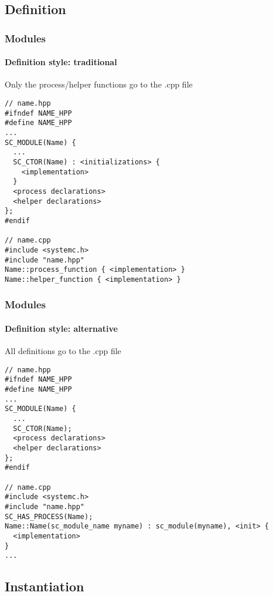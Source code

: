\subsection{Definition}

\begin{frame}[fragile]
\frametitle{Modules}
\framesubtitle{Definition style: traditional}

\begin{block}{Only the process/helper functions go to the .cpp file}
{\scriptsize
\vspace{-0.5em}
\begin{verbatim}
// name.hpp
#ifndef NAME_HPP
#define NAME_HPP
...
SC_MODULE(Name) {
  ...
  SC_CTOR(Name) : <initializations> {
    <implementation>
  }
  <process declarations>
  <helper declarations>
};
#endif

// name.cpp
#include <systemc.h>
#include "name.hpp"
Name::process_function { <implementation> }
Name::helper_function { <implementation> }
\end{verbatim}
}
\vspace{-0.5em}
\end{block}
\end{frame}

\begin{frame}[fragile]
\frametitle{Modules}
\framesubtitle{Definition style: alternative}

\begin{block}{All definitions go to the .cpp file}
{\scriptsize
\vspace{-0.5em}
\begin{verbatim}
// name.hpp
#ifndef NAME_HPP
#define NAME_HPP
...
SC_MODULE(Name) {
  ...
  SC_CTOR(Name);
  <process declarations>
  <helper declarations>
};
#endif

// name.cpp
#include <systemc.h>
#include "name.hpp"
SC_HAS_PROCESS(Name);
Name::Name(sc_module_name myname) : sc_module(myname), <init> {
  <implementation>
}
...
\end{verbatim}
}
\vspace{-0.8em}
\end{block}
\end{frame}

\subsection{Instantiation}

